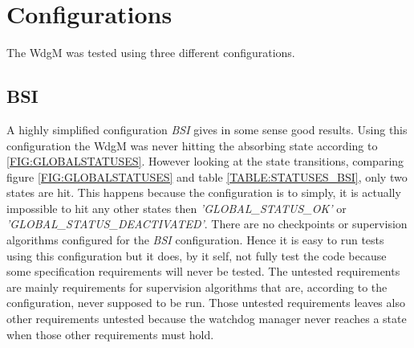 \section{Configurations}
The WdgM was tested using three different configurations.

\subsection{BSI}
A highly simplified configuration \emph{BSI} gives in some sense good results.
Using this configuration the WdgM was never hitting the absorbing state
according to \ref{FIG:GLOBALSTATUSES}.  However looking at the state
transitions, comparing figure \ref{FIG:GLOBALSTATUSES} and table
\ref{TABLE:STATUSES_BSI}, only two states are hit. This happens
because the configuration is to simply, it is actually impossible to hit
any other states then \emph{'GLOBAL\_STATUS\_OK'} or
\emph{'GLOBAL\_STATUS\_DEACTIVATED'}. There are no checkpoints or supervision
algorithms configured for the \emph{BSI} configuration.
Hence it is easy to run tests using this configuration but it does, by it self,
not fully test the code because some specification requirements will never be
tested. The untested requirements are mainly requirements for supervision algorithms
that are, according to the configuration, never supposed to be run. Those
untested requirements leaves also other requirements untested because
the watchdog manager never reaches a state when those other requirements must hold.
